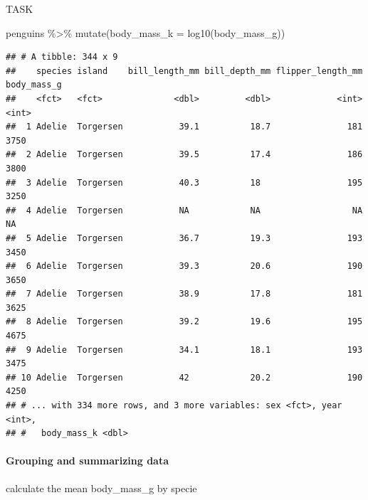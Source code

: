 \documentclass[
]{article}
\newenvironment{Shaded}{\begin{snugshade}}{\end{snugshade}}
\newcommand{\AttributeTok}[1]{\textcolor[rgb]{0.77,0.63,0.00}{#1}}
\newcommand{\FunctionTok}[1]{\textcolor[rgb]{0.00,0.00,0.00}{#1}}
\newcommand{\NormalTok}[1]{#1}
\newcommand{\SpecialCharTok}[1]{\textcolor[rgb]{0.00,0.00,0.00}{#1}}
\begin{document}
TASK

\begin{Shaded}
\begin{Highlighting}[]
\NormalTok{penguins }\SpecialCharTok{\%\textgreater{}\%} 
  \FunctionTok{mutate}\NormalTok{(}\AttributeTok{body\_mass\_k =} \FunctionTok{log10}\NormalTok{(body\_mass\_g))}
\end{Highlighting}
\end{Shaded}

\begin{verbatim}
## # A tibble: 344 x 9
##    species island    bill_length_mm bill_depth_mm flipper_length_mm body_mass_g
##    <fct>   <fct>              <dbl>         <dbl>             <int>       <int>
##  1 Adelie  Torgersen           39.1          18.7               181        3750
##  2 Adelie  Torgersen           39.5          17.4               186        3800
##  3 Adelie  Torgersen           40.3          18                 195        3250
##  4 Adelie  Torgersen           NA            NA                  NA          NA
##  5 Adelie  Torgersen           36.7          19.3               193        3450
##  6 Adelie  Torgersen           39.3          20.6               190        3650
##  7 Adelie  Torgersen           38.9          17.8               181        3625
##  8 Adelie  Torgersen           39.2          19.6               195        4675
##  9 Adelie  Torgersen           34.1          18.1               193        3475
## 10 Adelie  Torgersen           42            20.2               190        4250
## # ... with 334 more rows, and 3 more variables: sex <fct>, year <int>,
## #   body_mass_k <dbl>
\end{verbatim}

\hypertarget{grouping-and-summarizing-data}{%
\paragraph{Grouping and summarizing
data}\label{grouping-and-summarizing-data}}

calculate the mean body\_mass\_g by specie
\end{document}
